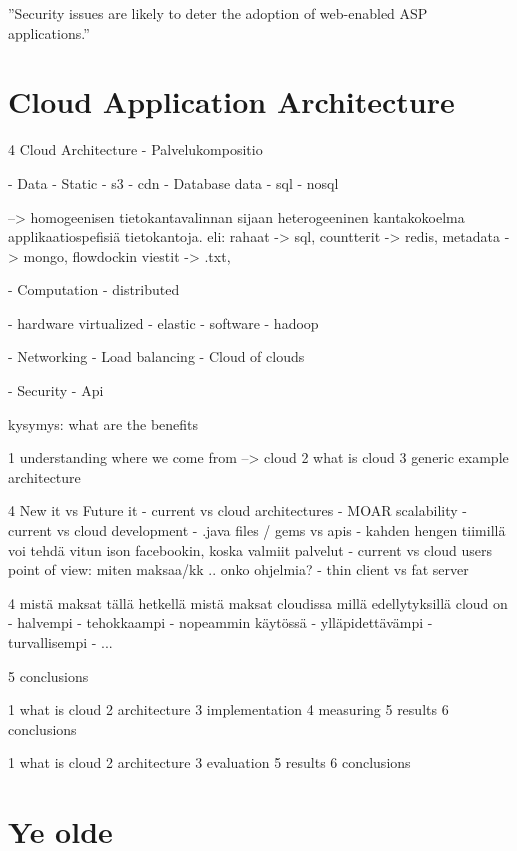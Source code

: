 \documentclass{tktltiki}
\begin{document}
''Security issues are likely to deter the adoption of web-enabled ASP applications.''
\cite{asp}



\section{Cloud Application Architecture}



4 Cloud Architecture
- Palvelukompositio

- Data
- Static
- s3
- cdn
- Database data
- sql
- nosql

--> homogeenisen tietokantavalinnan sijaan heterogeeninen kantakokoelma applikaatiospefisiä tietokantoja.  eli: rahaat -> sql, countterit -> redis, metadata -> mongo, flowdockin viestit -> .txt, 

- Computation
- distributed

- hardware
 virtualized
- elastic
- software
- hadoop

- Networking
- Load balancing
- Cloud of clouds

- Security
- Api



kysymys: what are the benefits

1 understanding where we come from --> cloud
2 what is cloud
3 generic example architecture


4 New it vs Future it
  - current vs cloud architectures
- MOAR scalability
  - current vs cloud development
- .java files / gems vs apis
- kahden hengen tiimillä voi tehdä vitun ison facebookin, koska valmiit palvelut
  - current vs cloud users point of view: miten maksaa/kk .. onko ohjelmia?
- thin client vs fat server

4 mistä maksat tällä hetkellä
    mistä maksat cloudissa
    millä edellytyksillä cloud on
   - halvempi
   - tehokkaampi
   - nopeammin käytössä
   - ylläpidettävämpi
   - turvallisempi
   - ...

5 conclusions


1 what is cloud
2 architecture
3 implementation
4 measuring
5 results
6 conclusions


1 what is cloud
2 architecture
3 evaluation
5 results
6 conclusions














\section{Ye olde}
\end{document}

